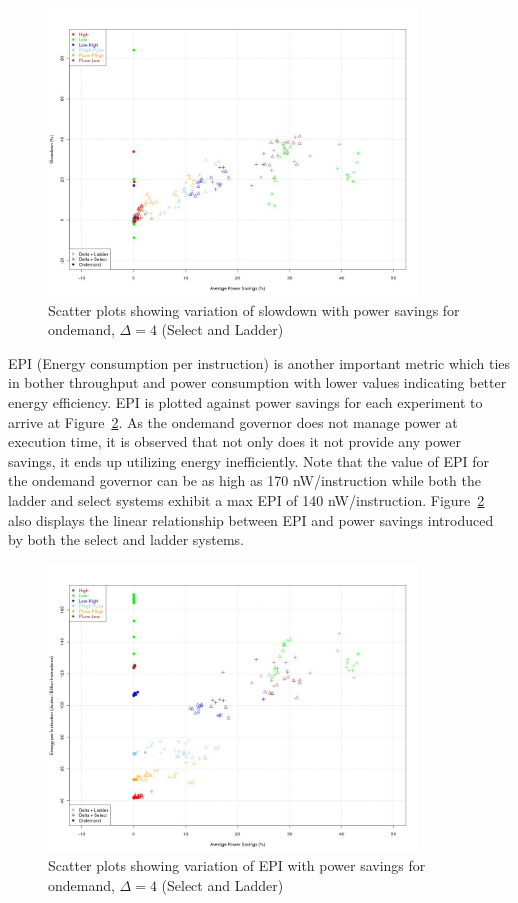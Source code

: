 \begin{figure}[h!]
  \begin{center}
    \includegraphics[height=3.0in]{figures/pwr_vs_slowdown_delta_4.jpg}
    \caption{Scatter plots showing variation of slowdown with power savings for ondemand, $\Delta=4$ (Select and Ladder)}
    \label{fig:pwr_vs_slowdown}
  \end{center}
\end{figure}

EPI (Energy consumption per instruction) is another important metric which ties in bother throughput and power
consumption with lower values indicating better energy efficiency. EPI is plotted 
against power savings for each experiment to arrive at Figure~\ref{fig:pwr_vs_jpbi}. As the ondemand governor
does not manage power at execution time, it is observed that not only does it not provide any power savings, 
it ends up utilizing energy inefficiently. Note that the value of EPI for the ondemand governor can be as high
as 170 nW/instruction while both the ladder and select systems exhibit a max EPI of 140 nW/instruction. 
Figure~\ref{fig:pwr_vs_jpbi} also displays the linear relationship between EPI and power savings introduced
by both the select and ladder systems.

\begin{figure}[h!]
  \begin{center}
    \includegraphics[height=3.0in]{figures/pwr_vs_jpbi_delta_4.jpg}
    \caption{Scatter plots showing variation of EPI with power savings for ondemand, $\Delta=4$ (Select and Ladder)}
    \label{fig:pwr_vs_jpbi}
  \end{center}
\end{figure}


